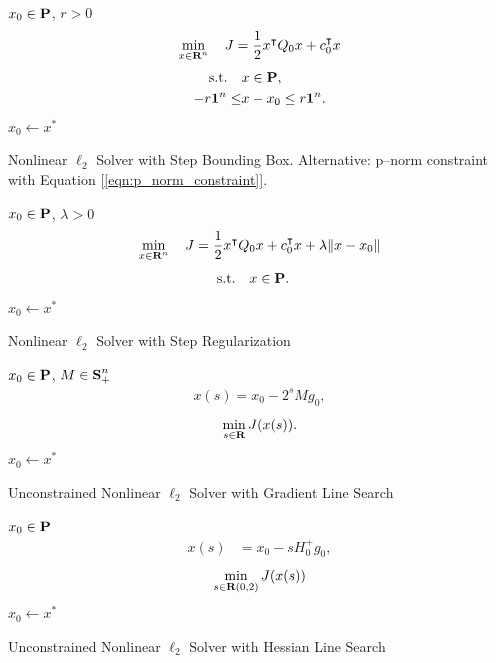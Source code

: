\documentclass{article}
\begin{document}
    \begin{algorithm}[H]
        \SetAlgoLined
        $x_0 \in\textbf{P}$, $r>0$\\
        {
            \begin{align*}
                \min_{x\in\textbf{R}^n}\quad J = \frac{1}{2}x^\intercal Q_0 x+c_0^\intercal x 
            \end{align*}
            \begin{align*}
                \text{s.t.} \quad &x\in\textbf{P},\\
                -r\textbf{1}^n\leq&x-x_0\leq r\textbf{1}^n.
            \end{align*}
            $x_0\leftarrow x^*$
        }
    \caption{Nonlinear $\ell_2$ Solver with Step Bounding Box. 
    Alternative: p--norm constraint with Equation [\ref{eqn:p_norm_constraint}].}
    \label{algo:it21}
    \end{algorithm}
    \begin{algorithm}[H]
        \SetAlgoLined
        $x_0 \in\textbf{P}$, $\lambda>0$\\
        {
            \begin{align*}
                \min_{x\in\textbf{R}^n}\quad J = \frac{1}{2}x^\intercal Q_0 x+c_0^\intercal x +\lambda \|x-x_0\|
            \end{align*}
            \begin{align*}
                \text{s.t.} \quad &x\in\textbf{P}.
            \end{align*}
            $x_0\leftarrow x^*$
        }
    \caption{Nonlinear $\ell_2$ Solver with Step Regularization}
    \label{algo:it22}
    \end{algorithm}
    \begin{algorithm}[H]
        \SetAlgoLined
        $x_0\in\textbf{P}$, $M\in\textbf{S}_+^n$\\
        {
            \begin{align*}
                x(s)=x_0-2^sMg_0,
            \end{align*}
            \begin{align*}
                \min_{s\in\textbf{R}} J(x(s)).
            \end{align*}
            $x_0\leftarrow x^*$
        }
    \caption{Unconstrained Nonlinear $\ell_2$ Solver with Gradient Line Search}
    \label{algo:it24}
    \end{algorithm}
    \begin{algorithm}[H]
        \SetAlgoLined
        $x_0\in\textbf{P}$\\
        {
            \begin{align*}
                x(s)&=x_0-sH_0^+g_0,
            \end{align*}
            \begin{align*}
                \min_{s\in\textbf{R}(0,2)} J(x(s))
            \end{align*}
            $x_0\leftarrow x^*$
        }
    \caption{Unconstrained Nonlinear $\ell_2$ Solver with Hessian Line Search}
    \label{algo:it23}
    \end{algorithm}
\clearpage
\end{document}

